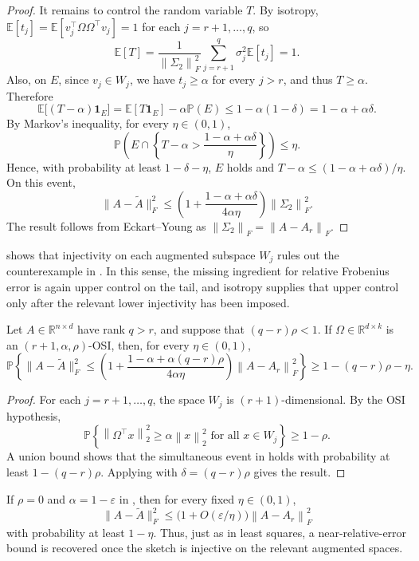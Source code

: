 \documentclass[onefignum,onetabnum]{siamart251216}
\newcommand{\R}{\mathbb{R}}
\newcommand{\E}{\mathbb{E}}
\newcommand{\Prob}{\mathbb{P}}
\newcommand{\norm}[1]{\left\lVert #1 \right\rVert}
\newcommand{\eps}{\varepsilon}
\begin{document}
\begin{proof}
It remains to control the random variable $T$.  By isotropy,
$
\E[t_j]
=
\E[v_j^\top\Omega\Omega^\top v_j]
=
1$ for each $j=r+1,\dots,q$,  so
\[
\E[T]
=
\frac{1}{\norm{\Sigma_2}_F^2}
\sum_{j=r+1}^q \sigma_j^2 \E[t_j]
=
1.
\]
Also, on $E$, since $v_j\in W_j$, we have $t_j\ge \alpha$ for every $j>r$, and thus $T\ge \alpha$. Therefore
\[
\E\bigl[(T-\alpha)\mathbf 1_E\bigr]
=
\E[T\mathbf 1_E]-\alpha\Prob(E)
\le
1-\alpha(1-\delta)
=
1-\alpha+\alpha\delta.
\]
By Markov's inequality, for every $\eta\in(0,1)$,
\[
\Prob\!\left(
E \cap
\left\{
T-\alpha > \frac{1-\alpha+\alpha\delta}{\eta}
\right\}
\right)
\le \eta.
\]
Hence, with probability at least $1-\delta-\eta$,  $E$ holds and
$
T-\alpha \le (1-\alpha+\alpha\delta)/\eta.
$
On this event,
\[
\|A-\widetilde A\|_F^2
\le
\left(1+\frac{1-\alpha+\alpha\delta}{4\alpha\eta}\right)\norm{\Sigma_2}_F^2.
\]
The result follows from Eckart--Young as 
$
\norm{\Sigma_2}_F = \norm{A-A_r}_F.
$
\end{proof}

 shows that injectivity on each augmented subspace $W_j$ rules out the counterexample in . In this sense, the missing ingredient for relative Frobenius error is again upper control on the tail, and isotropy supplies that upper control only after the relevant lower injectivity has been imposed.

\begin{corollary}\label{cor:rsvd-r-plus-one}
Let $A\in\R^{n\times d}$ have rank $q>r$, and suppose that $(q-r)\rho<1$.  If $\Omega\in\R^{d\times k}$ is an $(r+1,\alpha,\rho)$-OSI, then, for every $\eta\in(0,1)$,
\[
\Prob\!\left\{
\|A-\widetilde A\|_F^2
\le
\left(1+\frac{1-\alpha+\alpha(q-r)\rho}{4\alpha\eta}\right)\norm{A-A_r}_F^2
\right\}
\ge
1-(q-r)\rho-\eta.
\]
\end{corollary}
\begin{proof}
For each $j=r+1,\dots,q$, the space $W_j$ is $(r+1)$-dimensional.  By the OSI hypothesis,
\[
\Prob\!\left\{
\norm{\Omega^\top x}_2^2 \ge \alpha \norm{x}_2^2
\text{ for all } x\in W_j
\right\}
\ge 1-\rho.
\]
A union bound shows that the simultaneous event in  holds with probability at least
$
1-(q-r)\rho.
$
Applying  with $\delta=(q-r)\rho$ gives the result.
\end{proof}

If $\rho=0$ and $\alpha=1-\eps$ in , then for every fixed $\eta\in(0,1)$,
\[
\|A-\widetilde A\|_F^2
\le
\bigl(1+O(\eps/\eta)\bigr)\norm{A-A_r}_F^2
\]
with probability at least $1-\eta$.  Thus, just as in least squares, a near-relative-error bound is recovered once the sketch is injective on the relevant augmented spaces.
\end{document}
